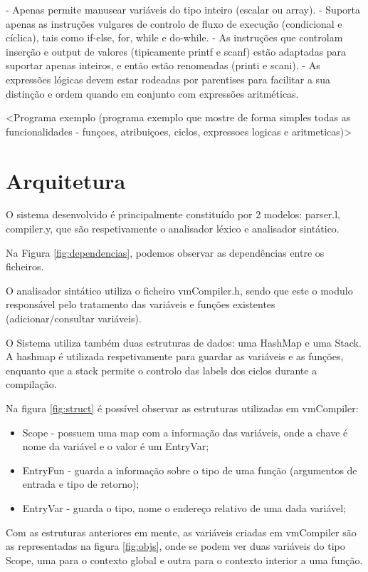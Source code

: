 \documentclass[a4paper,10pt]{report}
\begin{document}
    - Apenas permite manusear variáveis do tipo inteiro (escalar ou array).
    - Suporta apenas as instruções vulgares de controlo de fluxo de execução (condicional e cíclica), tais como if-else, for, while e do-while.
    - As instruções que controlam inserção e output de valores (tipicamente printf e scanf) estão adaptadas para suportar apenas inteiros, e então estão renomeadas (printi e scani).
    - As expressões lógicas devem estar rodeadas por parentises para facilitar a sua distinção e ordem quando em conjunto com expressões aritméticas. 


    <Programa exemplo (programa exemplo que mostre de forma simples todas as funcionalidades - funçoes, atribuiçoes, ciclos, expressoes logicas e aritmeticas)> 

\section{Arquitetura}
    O sistema desenvolvido é principalmente constituído por 2 modelos:  parser.l, compiler.y, que são respetivamente o analisador léxico e analisador sintático. 

    Na Figura \ref{fig:dependencias}, podemos observar as dependências entre os ficheiros.

    O analisador sintático utiliza o ficheiro vmCompiler.h, sendo que este o modulo responsável pelo tratamento das variáveis e funções existentes (adicionar/consultar variáveis).

    O Sistema utiliza também duas estruturas de dados: uma HashMap e uma Stack. A hashmap é utilizada respetivamente para guardar as variáveis e as funções, enquanto que a stack permite o controlo das labels dos ciclos durante a compilação.

    Na figura \ref{fig:struct} é possível observar as estruturas utilizadas em vmCompiler:
    \begin{itemize}
      \item Scope - possuem uma map com a informação das variáveis, onde a chave é nome da variável e o valor é um EntryVar;
      \item EntryFun - guarda a informação sobre o tipo de uma função (argumentos de entrada e tipo de retorno);
      \item EntryVar - guarda o tipo, nome o endereço relativo de uma dada variável;
    \end{itemize}

    Com as estruturas anteriores em mente, as variáveis criadas em vmCompiler são as representadas na figura \ref{fig:objs}, onde se podem ver duas variáveis do tipo Scope, uma para o contexto global e outra para o contexto interior a uma função.
\end{document}
